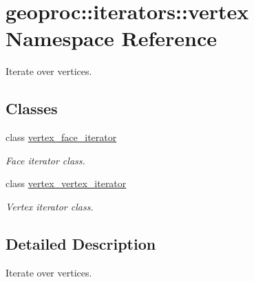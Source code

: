 \hypertarget{namespacegeoproc_1_1iterators_1_1vertex}{}\section{geoproc\+:\+:iterators\+:\+:vertex Namespace Reference}
\label{namespacegeoproc_1_1iterators_1_1vertex}


Iterate over vertices.  


\subsection*{Classes}
\begin{DoxyCompactItemize}
\item 
class \hyperlink{classgeoproc_1_1iterators_1_1vertex_1_1vertex__face__iterator}{vertex\+\_\+face\+\_\+iterator}
\begin{DoxyCompactList}\small\item\em Face iterator class. \end{DoxyCompactList}\item 
class \hyperlink{classgeoproc_1_1iterators_1_1vertex_1_1vertex__vertex__iterator}{vertex\+\_\+vertex\+\_\+iterator}
\begin{DoxyCompactList}\small\item\em Vertex iterator class. \end{DoxyCompactList}\end{DoxyCompactItemize}


\subsection{Detailed Description}
Iterate over vertices. 
